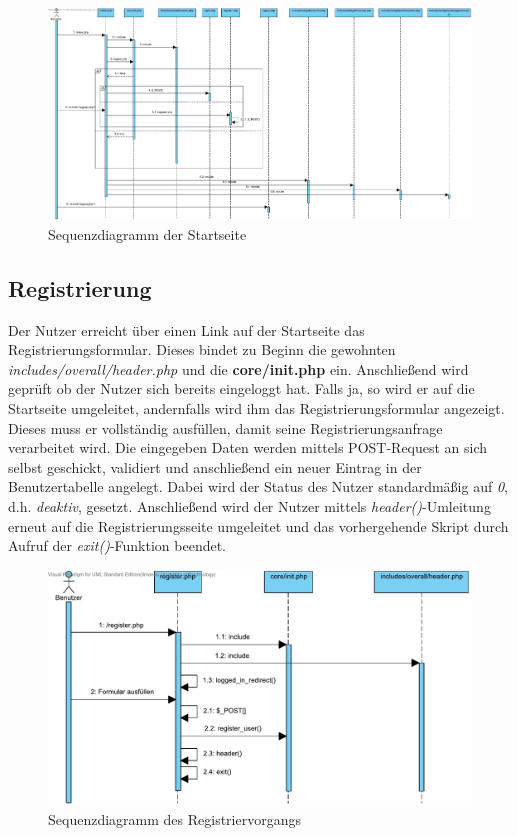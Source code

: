 \documentclass[fontsize = 12pt, paper = a4]{scrreprt}
\begin{document}
\begin{figure}[h]
\centering
\includegraphics[scale = 0.315]{startseite}
\caption[Sequenzdiagramm der Startseite]{Sequenzdiagramm der Startseite}
\label{index}
\end{figure}

\newpage
\subsection{Registrierung}
Der Nutzer erreicht über einen Link auf der Startseite das Registrierungsformular. Dieses bindet zu Beginn die gewohnten \textit{includes/overall/header.php} und die \textbf{core/init.php} ein. Anschließend wird geprüft ob der Nutzer sich bereits eingeloggt hat. Falls ja, so wird er auf die Startseite umgeleitet, andernfalls wird ihm das Registrierungsformular angezeigt. Dieses muss er vollständig ausfüllen, damit seine Registrierungsanfrage verarbeitet wird. Die eingegeben Daten werden mittels POST-Request an sich selbst geschickt, validiert und anschließend ein neuer Eintrag in der Benutzertabelle angelegt. Dabei wird der Status des Nutzer standardmäßig auf \textit{0}, d.h. \textit{deaktiv}, gesetzt. Anschließend wird der Nutzer mittels \textit{header()}-Umleitung erneut auf die Registrierungsseite umgeleitet und das vorhergehende Skript durch Aufruf der \textit{exit()}-Funktion beendet.

\begin{figure}[h]
\centering
\includegraphics[scale = 0.75]{registrierung}
\caption[Sequenzdiagramm des Registriervorgangs]{Sequenzdiagramm des Registriervorgangs}
\label{registrierung}
\end{figure}
\end{document}
